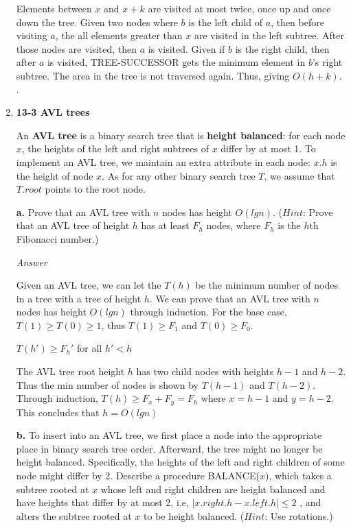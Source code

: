 \documentclass{article}
\begin{document}
\begin{enumerate}
Elements between $x$ and $x + k$ are visited at most twice, once up and once down the tree. Given two nodes where $b$ is the left child of $a$, then before visiting $a$, the all elements greater than $x$ are visited in the left subtree. After those nodes are visited, then $a$ is visited. Given if $b$ is the right child, then after $a$ is visited, TREE-SUCCESSOR gets the minimum element in $b$'s right subtree. The area in the tree is not traversed again. Thus, giving $O(h + k)$.
\newpage. 

\item \textbf{13-3 AVL trees}

An \textbf{AVL tree} is a binary search tree that is \textbf{height balanced}: for each node $x$, the heights of the left and right subtrees of $x$ differ by at most 1. To implement an AVL tree, we maintain an extra attribute in each node: $x.h$ is the height of node $x$. As for any other binary search tree $T$, we assume that $T.root$ points to the root node. 

\subitem \textbf{a.} Prove that an AVL tree with $n$ nodes has height $O(lgn)$. ($Hint$: Prove that an AVL tree of height $h$ has at least $F_h$ nodes, where $F_h$ is the $h$th Fibonacci number.) 

\textit{Answer}

Given an AVL tree, we can let the $T(h)$ be the minimum number of nodes in a tree with a tree of height $h$. We can prove that an AVL tree with $n$ nodes has height $O(lgn)$ through induction. For the base case, $T(1) \geq T(0) \geq 1$, thus $T(1) \geq F_1$ and $T(0) \geq F_0$.  

$T(h') \geq F_h'$ for all $h' < h$

The AVL tree root height $h$ has two child nodes with heights $h-1$ and $h-2$. Thus the min number of nodes is shown by $T(h-1)$ and $T(h-2)$. Through induction, $T(h) \geq F_x + F_y = F_h$ where $ x = h - 1$ and $y = h-2$. This concludes that $h=O(lgn)$

\newpage

\subitem \textbf{b.} To insert into an AVL tree, we first place a node into the appropriate place in binary search tree order. Afterward, the tree might no longer be height balanced. Specifically, the heights of the left and right children of some node might differ by 2. Describe a procedure BALANCE($x$), which takes a subtree rooted at $x$ whose left and right children are height balanced and have heights that differ by at most 2, i.e, $|x.right.h - x.left.h| \leq 2$ , and alters the subtree rooted at $x$ to be height balanced. ($Hint$: Use rotations.)


\end{enumerate}
\end{document}
